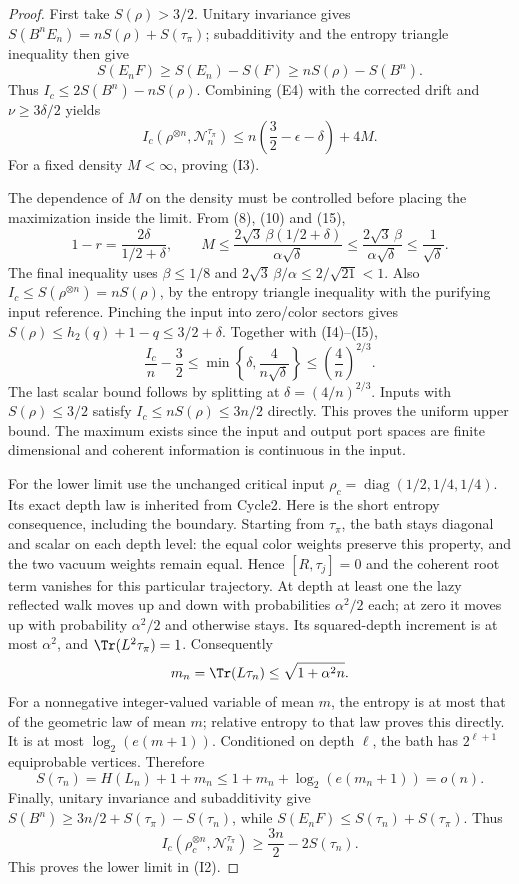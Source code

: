 \begin{proof}
First take $S(\rho)>3/2$. Unitary invariance gives
$S(B^nE_n)=nS(\rho)+S(\tau_\pi)$; subadditivity and the entropy
triangle inequality then give
\[
 S(E_nF)\ge S(E_n)-S(F)
 \ge nS(\rho)-S(B^n).
\]
Thus $I_c\le2S(B^n)-nS(\rho)$. Combining (E4) with the corrected
drift and $\nu\ge3\delta/2$ yields
\[
 I_c(\rho^{\otimes n},\mathcal N_n^{\tau_\pi})
 \le n\left(\frac32-\epsilon-\delta\right)+4M.
 \tag{I4}
\]
For a fixed density $M<\infty$, proving (I3).

The dependence of $M$ on the density must be controlled before placing
the maximization inside the limit. From (8), (10) and (15),
\[
 1-r=\frac{2\delta}{1/2+\delta},\qquad
 M\le\frac{2\sqrt3\,\beta(1/2+\delta)}{\alpha\sqrt\delta}
 \le\frac{2\sqrt3\,\beta}{\alpha\sqrt\delta}
 \le\frac1{\sqrt\delta}.
 \tag{I5}
\]
The final inequality uses $\beta\le1/8$ and
$2\sqrt3\,\beta/\alpha\le2/\sqrt{21}<1$.
Also $I_c\le S(\rho^{\otimes n})=nS(\rho)$, by the entropy triangle
inequality with the purifying input reference. Pinching the input into
zero/color sectors gives $S(\rho)\le h_2(q)+1-q\le3/2+\delta$.
Together with (I4)--(I5),
\[
 \frac{I_c}{n}-\frac32
 \le\min\left\{\delta,\frac4{n\sqrt\delta}\right\}
 \le\left(\frac4n\right)^{2/3}.
 \tag{I6}
\]
The last scalar bound follows by splitting at
$\delta=(4/n)^{2/3}$. Inputs with $S(\rho)\le3/2$ satisfy
$I_c\le nS(\rho)\le3n/2$ directly. This proves the uniform upper bound.
The maximum exists since the input and output port spaces are finite
dimensional and coherent information is continuous in the input.

For the lower limit use the unchanged critical input
$\rho_c=\operatorname{diag}(1/2,1/4,1/4)$. Its exact depth law is inherited
from Cycle2. Here is the short entropy consequence, including the boundary.
Starting from $\tau_\pi$, the bath stays diagonal and scalar on each depth
level: the equal color weights preserve this property, and the two vacuum
weights remain equal. Hence $[R,\tau_j]=0$ and the coherent root term
vanishes for this particular trajectory. At depth at least one the lazy
reflected walk moves up and down with probabilities $\alpha^2/2$ each;
at zero it moves up with probability $\alpha^2/2$ and otherwise stays.
Its squared-depth increment is at most $\alpha^2$, and
$\Tr(L^2\tau_\pi)=1$. Consequently
\[
 m_n=\Tr(L\tau_n)\le\sqrt{1+\alpha^2n}.
\]
For a nonnegative integer-valued variable of mean $m$, the entropy is
at most that of the geometric law of mean $m$; relative entropy to that
law proves this directly. It is at most $\log_2(e(m+1))$.
Conditioned on depth $\ell$, the bath has $2^{\ell+1}$ equiprobable
vertices. Therefore
\[
 S(\tau_n)=H(L_n)+1+m_n
 \le1+m_n+\log_2(e(m_n+1))=o(n).
 \tag{I7}
\]
Finally, unitary invariance and subadditivity give
$S(B^n)\ge3n/2+S(\tau_\pi)-S(\tau_n)$, while
$S(E_nF)\le S(\tau_n)+S(\tau_\pi)$. Thus
\[
 I_c(\rho_c^{\otimes n},\mathcal N_n^{\tau_\pi})
 \ge\frac{3n}{2}-2S(\tau_n).
 \tag{I8}
\]
This proves the lower limit in (I2).
\end{proof}

